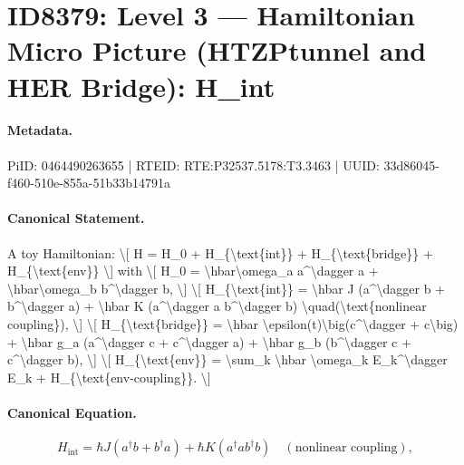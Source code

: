 \section*{ID8379: Level 3 — Hamiltonian Micro Picture (HTZPtunnel and HER Bridge): H\_int}
\paragraph{Metadata.}
PiID: 0464490263655 | RTEID: RTE:P32537.5178:T3.3463 | UUID: 33d86045-f460-510e-855a-51b33b14791a

\paragraph{Canonical Statement.}
A toy Hamiltonian: \textbackslash{}[ H = H\_0 + H\_\{\textbackslash{}text\{int\}\} + H\_\{\textbackslash{}text\{bridge\}\} + H\_\{\textbackslash{}text\{env\}\} \textbackslash{}] with \textbackslash{}[ H\_0 = \textbackslash{}hbar\textbackslash{}omega\_a a\textasciicircum{}\textbackslash{}dagger a + \textbackslash{}hbar\textbackslash{}omega\_b b\textasciicircum{}\textbackslash{}dagger b, \textbackslash{}] \textbackslash{}[ H\_\{\textbackslash{}text\{int\}\} = \textbackslash{}hbar J (a\textasciicircum{}\textbackslash{}dagger b + b\textasciicircum{}\textbackslash{}dagger a) + \textbackslash{}hbar K (a\textasciicircum{}\textbackslash{}dagger a b\textasciicircum{}\textbackslash{}dagger b) \textbackslash{}quad(\textbackslash{}text\{nonlinear coupling\}), \textbackslash{}] \textbackslash{}[ H\_\{\textbackslash{}text\{bridge\}\} = \textbackslash{}hbar \textbackslash{}epsilon(t)\textbackslash{}big(c\textasciicircum{}\textbackslash{}dagger + c\textbackslash{}big) + \textbackslash{}hbar g\_a (a\textasciicircum{}\textbackslash{}dagger c + c\textasciicircum{}\textbackslash{}dagger a) + \textbackslash{}hbar g\_b (b\textasciicircum{}\textbackslash{}dagger c + c\textasciicircum{}\textbackslash{}dagger b), \textbackslash{}] \textbackslash{}[ H\_\{\textbackslash{}text\{env\}\} = \textbackslash{}sum\_k \textbackslash{}hbar \textbackslash{}omega\_k E\_k\textasciicircum{}\textbackslash{}dagger E\_k + H\_\{\textbackslash{}text\{env-coupling\}\}. \textbackslash{}]

\paragraph{Canonical Equation.}
\[
H_{\text{int}} = \hbar J (a^\dagger b + b^\dagger a) + \hbar K (a^\dagger a b^\dagger b) \quad(\text{nonlinear coupling}),
\]

